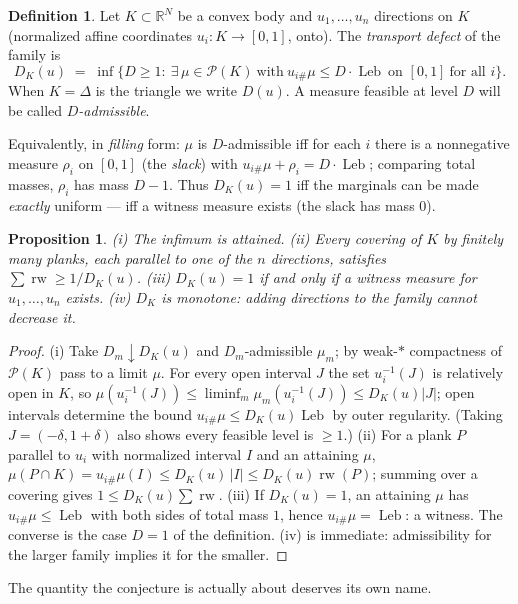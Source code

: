 \documentclass[11pt,reqno]{amsart}
\theoremstyle{plain}
\newtheorem{proposition}[theorem]{Proposition}
\theoremstyle{definition}
\newtheorem{definition}[theorem]{Definition}
\theoremstyle{remark}
\newcommand{\rw}{\operatorname{rw}}
\newcommand{\Leb}{\operatorname{Leb}}
\newcommand{\R}{\mathbb{R}}
\begin{document}
\begin{definition}\label{def:defect}
Let $K\subset\R^N$ be a convex body and $u_1,\dots,u_n$ directions on $K$
(normalized affine coordinates $u_i:K\to[0,1]$, onto). The \emph{transport
defect} of the family is
\[
D_K(u)\;=\;\inf\bigl\{D\ge1:\ \exists\,\mu\in\mathcal P(K)\ \text{with}\
u_{i\#}\mu\le D\cdot\Leb\ \text{on }[0,1]\ \text{for all }i\bigr\}.
\]
When $K=\Delta$ is the triangle we write $D(u)$. A measure feasible at level
$D$ will be called \emph{$D$-admissible}.
\end{definition}

Equivalently, in \emph{filling} form: $\mu$ is $D$-admissible iff for each $i$
there is a nonnegative measure $\rho_i$ on $[0,1]$ (the \emph{slack}) with
$u_{i\#}\mu+\rho_i=D\cdot\Leb$; comparing total masses, $\rho_i$ has mass
$D-1$. Thus $D_K(u)=1$ iff the marginals can be made \emph{exactly} uniform ---
iff a witness measure exists (the slack has mass $0$).

\begin{proposition}\label{prop:defect}
(i) The infimum is attained. (ii) Every covering of $K$ by finitely many
planks, each parallel to one of the $n$ directions, satisfies
$\sum\rw\ge 1/D_K(u)$. (iii) $D_K(u)=1$ if and only if a witness measure for
$u_1,\dots,u_n$ exists. (iv) $D_K$ is monotone: adding directions to the
family cannot decrease it.
\end{proposition}

\begin{proof}
(i) Take $D_m\downarrow D_K(u)$ and $D_m$-admissible $\mu_m$; by weak-$*$
compactness of $\mathcal P(K)$ pass to a limit $\mu$. For every open interval
$J$ the set $u_i^{-1}(J)$ is relatively open in $K$, so
$\mu(u_i^{-1}(J))\le\liminf_m\mu_m(u_i^{-1}(J))\le D_K(u)|J|$; open intervals
determine the bound $u_{i\#}\mu\le D_K(u)\Leb$ by outer regularity. (Taking
$J=(-\delta,1+\delta)$ also shows every feasible level is $\ge1$.)
(ii) For a plank $P$ parallel to $u_i$ with normalized interval $I$ and an
attaining $\mu$,
$\mu(P\cap K)=u_{i\#}\mu(I)\le D_K(u)\,|I|\le D_K(u)\rw(P)$; summing over a
covering gives $1\le D_K(u)\sum\rw$.
(iii) If $D_K(u)=1$, an attaining $\mu$ has $u_{i\#}\mu\le\Leb$ with both sides
of total mass $1$, hence $u_{i\#}\mu=\Leb$: a witness. The converse is the case
$D=1$ of the definition. (iv) is immediate: admissibility for the larger family
implies it for the smaller.
\end{proof}

The quantity the conjecture is actually about deserves its own name.
\end{document}
